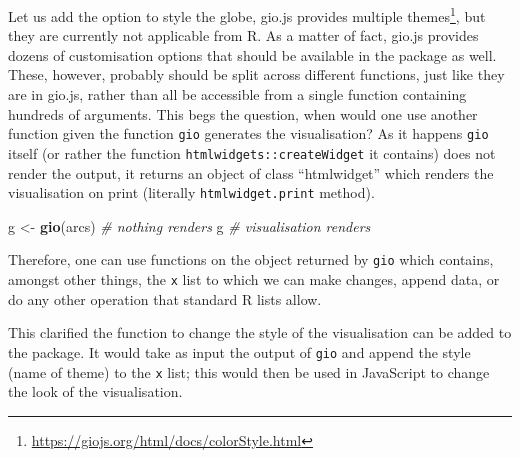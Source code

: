 \documentclass[
  10pt,
]{krantz}
\makeatletter
\newenvironment{Shaded}{\begin{snugshade}}{\end{snugshade}}
\newcommand{\CommentTok}[1]{\textcolor[rgb]{0.37,0.37,0.37}{\textit{#1}}}
\newcommand{\ControlFlowTok}[1]{\textcolor[rgb]{0.27,0.27,0.27}{\textbf{#1}}}
\newcommand{\DataTypeTok}[1]{\textcolor[rgb]{0.27,0.27,0.27}{#1}}
\newcommand{\KeywordTok}[1]{\textcolor[rgb]{0.27,0.27,0.27}{\textbf{#1}}}
\newcommand{\NormalTok}[1]{#1}
\newcommand{\OperatorTok}[1]{\textcolor[rgb]{0.43,0.43,0.43}{\textbf{#1}}}
\newcommand{\StringTok}[1]{\textcolor[rgb]{0.5,0.5,0.5}{#1}}
\renewcommand{\href}[2]{#2\footnote{\url{#1}}}
\newenvironment{kframe}{%
\medskip{}
\setlength{\fboxsep}{.8em}
 \def\at@end@of@kframe{}%
 \ifinner\ifhmode%
  \def\at@end@of@kframe{\end{minipage}}%
  \begin{minipage}{\columnwidth}%
 \fi\fi%
 \def\FrameCommand##1{\hskip\@totalleftmargin \hskip-\fboxsep
 \colorbox{shadecolor}{##1}\hskip-\fboxsep
     \hskip-\linewidth \hskip-\@totalleftmargin \hskip\columnwidth}%
 \MakeFramed {\advance\hsize-\width
   \@totalleftmargin\z@ \linewidth\hsize
   \@setminipage}}%
 {\par\unskip\endMakeFramed%
 \at@end@of@kframe}
\renewenvironment{Shaded}{\begin{kframe}}{\end{kframe}}
\makeatother
\begin{document}
Let us add the option to style the globe, gio.js provides multiple \href{https://giojs.org/html/docs/colorStyle.html}{themes}, but they are currently not applicable from R. As a matter of fact, gio.js provides dozens of customisation options that should be available in the package as well. These, however, probably should be split across different functions, just like they are in gio.js, rather than all be accessible from a single function containing hundreds of arguments. This begs the question, when would one use another function given the function \texttt{gio} generates the visualisation? As it happens \texttt{gio} itself (or rather the function \texttt{htmlwidgets::createWidget} it contains) does not render the output, it returns an object of class ``htmlwidget'' which renders the visualisation on print (literally \texttt{htmlwidget.print} method).

\begin{Shaded}
\begin{Highlighting}[]
\NormalTok{g <{-}}\StringTok{ }\KeywordTok{gio}\NormalTok{(arcs) }\CommentTok{\# nothing renders}
\NormalTok{g }\CommentTok{\# visualisation renders}
\end{Highlighting}
\end{Shaded}

Therefore, one can use functions on the object returned by \texttt{gio} which contains, amongst other things, the \texttt{x} list to which we can make changes, append data, or do any other operation that standard R lists allow.

\begin{Shaded}
\end{Shaded}

This clarified the function to change the style of the visualisation can be added to the package. It would take as input the output of \texttt{gio} and append the style (name of theme) to the \texttt{x} list; this would then be used in JavaScript to change the look of the visualisation.

\begin{Shaded}
\end{Shaded}
\end{document}
